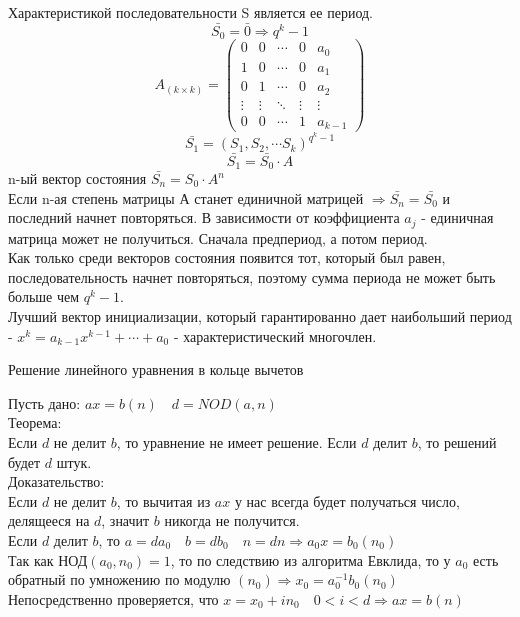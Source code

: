 Характеристикой последовательности S является ее период.
\[\bar{S_0} = \bar{0} \Rightarrow q^k - 1\]
\begin{displaymath}
A_{(k \times k)} = \left(\begin{array}{lcccr}
0 & 0 & \cdots & 0 & a_0\\
1 & 0 & \cdots & 0 & a_1\\
0 & 1 & \cdots & 0 & a_2\\
\vdots & \vdots & \ddots & \vdots & \vdots\\
0 & 0 & \cdots & 1 & a_{k-1}
\end{array}\right)
\end{displaymath}
\[\bar{S_1} = (S_1, S_2, \cdots S_k)^{q^{k}-1}\]
\[\bar{S_1} = \bar{S_0} \cdot A\]
n-ый вектор состояния $\bar{S_n} = S_0 \cdot A^n$\\
Если n-ая степень матрицы А станет единичной матрицей $\Rightarrow \bar{S_n} =
\bar{S_0}$ и последний начнет
повторяться. В зависимости от коэффициента $a_j$ - единичная матрица может не
получиться. Сначала предпериод, а
потом период.\\
Как только среди векторов состояния появится тот, который был равен,
последовательность начнет повторяться,
поэтому сумма периода не может быть больше чем $q^k - 1$.\\
Лучший вектор инициализации, который гарантированно дает наибольший период -
$x^k = a_{k - 1} x^{k - 1} + \cdots +
a_0$ - характеристический многочлен.\\

\begin{title}
  Решение линейного уравнения в кольце вычетов
\end{title}

Пусть дано: $ax = b(n) \quad d = NOD (a, n)$\\
Теорема:\\
Если $d$ не делит $b$, то уравнение не имеет решение. Если $d$ делит $b$, то
решений будет $d$ штук.\\
Доказательство:\\
Если $d$ не делит $b$, то вычитая из $ax$ у нас всегда будет получаться число,
делящееся на $d$, значит $b$ никогда
не получится.\\
Если $d$ делит $b$, то $a = da_0 \quad b = db_0 \quad n =dn \Rightarrow a_0x = b_0(n_0)$\\
Так как НОД$(a_0, n_0) = 1$, то по следствию из алгоритма Евклида, то у $a_0$
есть обратный по умножению по модулю
$(n_0) \Rightarrow x_0 = a_0^{-1}b_0(n_0)$\\
Непосредственно проверяется, что $x = x_0 + i n_0 \quad 0 < i < d \Rightarrow ax = b(n)$

